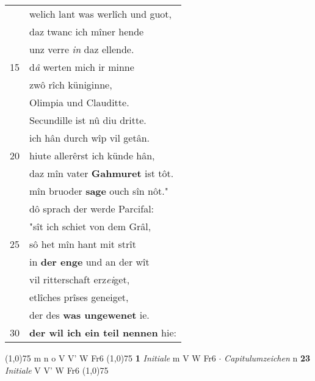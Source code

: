 \documentclass[8pt,a4paper,notitlepage]{article}
\begin{document}
\begin{table}[ht]
\begin{minipage}[t]{0.5\linewidth}
\begin{tabular}{rl}
 & welich lant was werlîch und guot,\\ 
 & daz twanc ich mîner hende\\ 
 & unz verre \textit{in} daz ellende.\\ 
15 & d\textit{â} werten mich ir minne\\ 
 & zwô rîch küniginne,\\ 
 & Olimpia und Clauditte.\\ 
 & Secundille ist nû diu dritte.\\ 
 & ich hân durch wîp vil getân.\\ 
20 & hiute allerêrst ich künde hân,\\ 
 & daz mîn vater \textbf{Gahmuret} ist tôt.\\ 
 & mîn bruoder \textbf{sage} ouch sîn nôt."\\ 
 & dô sprach der werde Parcifal:\\ 
 & "sît ich schiet von dem Grâl,\\ 
25 & sô het mîn hant mit strît\\ 
 & in \textbf{der enge} und an der wît\\ 
 & vil ritterschaft erz\textit{ei}get,\\ 
 & etlîches prîses geneiget,\\ 
 & der des \textbf{was ungewenet} ie.\\ 
30 & \textbf{der wil ich ein teil nennen} hie:\\ 
\end{tabular}
\scriptsize
\line(1,0){75} \newline
m n o V V' W Fr6 \newline
\line(1,0){75} \newline
\textbf{1} \textit{Initiale} m V W Fr6   $\cdot$ \textit{Capitulumzeichen} n  \textbf{23} \textit{Initiale} V V' W Fr6  \newline
\line(1,0){75} \newline

\end{minipage}
\end{table}
\end{document}
